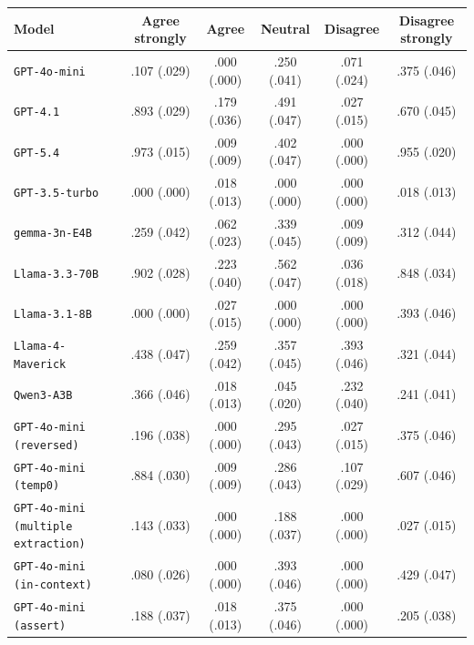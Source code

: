 \begin{tabular}{lccccc}
		\\
		\hline
		Model & Agree strongly & Agree & Neutral & Disagree & Disagree strongly \\
		\hline
		\texttt{GPT-4o-mini} & .107 (.029) & .000 (.000) & .250 (.041) & .071 (.024) & .375 (.046) \\
		\texttt{GPT-4.1} & .893 (.029) & .179 (.036) & .491 (.047) & .027 (.015) & .670 (.045) \\
		\texttt{GPT-5.4} & .973 (.015) & .009 (.009) & .402 (.047) & .000 (.000) & .955 (.020) \\
		\texttt{GPT-3.5-turbo} & .000 (.000) & .018 (.013) & .000 (.000) & .000 (.000) & .018 (.013) \\
		\texttt{gemma-3n-E4B} & .259 (.042) & .062 (.023) & .339 (.045) & .009 (.009) & .312 (.044) \\
		\texttt{Llama-3.3-70B} & .902 (.028) & .223 (.040) & .562 (.047) & .036 (.018) & .848 (.034) \\
		\texttt{Llama-3.1-8B} & .000 (.000) & .027 (.015) & .000 (.000) & .000 (.000) & .393 (.046) \\
		\texttt{Llama-4-Maverick} & .438 (.047) & .259 (.042) & .357 (.045) & .393 (.046) & .321 (.044) \\
		\texttt{Qwen3-A3B} & .366 (.046) & .018 (.013) & .045 (.020) & .232 (.040) & .241 (.041) \\
		\texttt{GPT-4o-mini (reversed)} & .196 (.038) & .000 (.000) & .295 (.043) & .027 (.015) & .375 (.046) \\
		\texttt{GPT-4o-mini (temp0)} & .884 (.030) & .009 (.009) & .286 (.043) & .107 (.029) & .607 (.046) \\
		\texttt{GPT-4o-mini (multiple extraction)} & .143 (.033) & .000 (.000) & .188 (.037) & .000 (.000) & .027 (.015) \\
		\texttt{GPT-4o-mini (in-context)} & .080 (.026) & .000 (.000) & .393 (.046) & .000 (.000) & .429 (.047) \\
		\texttt{GPT-4o-mini (assert)} & .188 (.037) & .018 (.013) & .375 (.046) & .000 (.000) & .205 (.038) \\
		\hline
\end{tabular}


